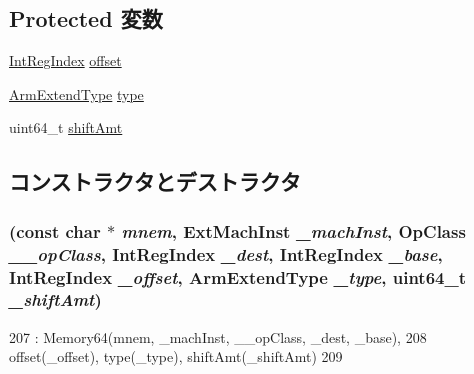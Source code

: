 \subsection*{Protected 変数}
\begin{DoxyCompactItemize}
\item 
\hyperlink{namespaceArmISA_ae64680ba9fb526106829d6bf92fc791b}{IntRegIndex} \hyperlink{classArmISA_1_1MemoryReg64_ad79e279288c1e6eacd9fced538dd1d7c}{offset}
\item 
\hyperlink{namespaceArmISA_a4420842b5673543552a3aba317c69dbb}{ArmExtendType} \hyperlink{classArmISA_1_1MemoryReg64_a0822cc4af9f88047e13ca95f7d8c0830}{type}
\item 
uint64\_\-t \hyperlink{classArmISA_1_1MemoryReg64_af6cfb90c73bfd849b872e44c63c95fa1}{shiftAmt}
\end{DoxyCompactItemize}


\subsection{コンストラクタとデストラクタ}
\hypertarget{classArmISA_1_1MemoryReg64_ac98757c3b56f35c1aea7c040106a8afd}{
\subsubsection[{MemoryReg64}]{ (const char $\ast$ {\em mnem}, \/  {\bf ExtMachInst} {\em \_\-machInst}, \/  OpClass {\em \_\-\_\-opClass}, \/  {\bf IntRegIndex} {\em \_\-dest}, \/  {\bf IntRegIndex} {\em \_\-base}, \/  {\bf IntRegIndex} {\em \_\-offset}, \/  {\bf ArmExtendType} {\em \_\-type}, \/  uint64\_\-t {\em \_\-shiftAmt})}}
\label{classArmISA_1_1MemoryReg64_ac98757c3b56f35c1aea7c040106a8afd}



\begin{DoxyCode}
207         : Memory64(mnem, _machInst, __opClass, _dest, _base),
208           offset(_offset), type(_type), shiftAmt(_shiftAmt)
209     {}
\end{DoxyCode}


